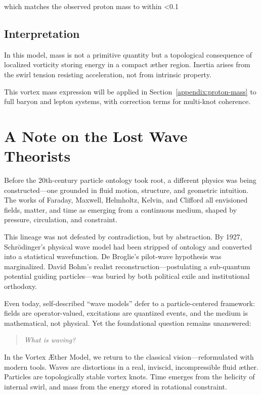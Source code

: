 \documentclass[twocolumn,aps,pre,floatfix,nofootinbib]{revtex4-2}
\begin{document}
which matches the observed proton mass to within \textless 0.1%

\subsection{Interpretation}

In this model, mass is not a primitive quantity but a topological consequence of localized vorticity storing energy in a compact æther region. Inertia arises from the swirl tension resisting acceleration, not from intrinsic property.

This vortex mass expression will be applied in Section~\ref{appendix:proton-mass} to full baryon and lepton systems, with correction terms for multi-knot coherence.


\section*{A Note on the Lost Wave Theorists}

Before the 20th-century particle ontology took root, a different physics was being constructed—one grounded in fluid motion, structure, and geometric intuition. The works of Faraday, Maxwell, Helmholtz, Kelvin, and Clifford all envisioned fields, matter, and time as emerging from a continuous medium, shaped by pressure, circulation, and constraint.

This lineage was not defeated by contradiction, but by abstraction. By 1927, Schrödinger’s physical wave model had been stripped of ontology and converted into a statistical wavefunction. De Broglie’s pilot-wave hypothesis was marginalized. David Bohm’s realist reconstruction—postulating a sub-quantum potential guiding particles—was buried by both political exile and institutional orthodoxy.

Even today, self-described “wave models” defer to a particle-centered framework: fields are operator-valued, excitations are quantized events, and the medium is mathematical, not physical. Yet the foundational question remains unanswered:

\begin{quote}
\textit{What is waving?}
\end{quote}

In the Vortex \AE ther Model, we return to the classical vision—reformulated with modern tools. Waves are distortions in a real, inviscid, incompressible fluid æther. Particles are topologically stable vortex knots. Time emerges from the helicity of internal swirl, and mass from the energy stored in rotational constraint.
\end{document}
